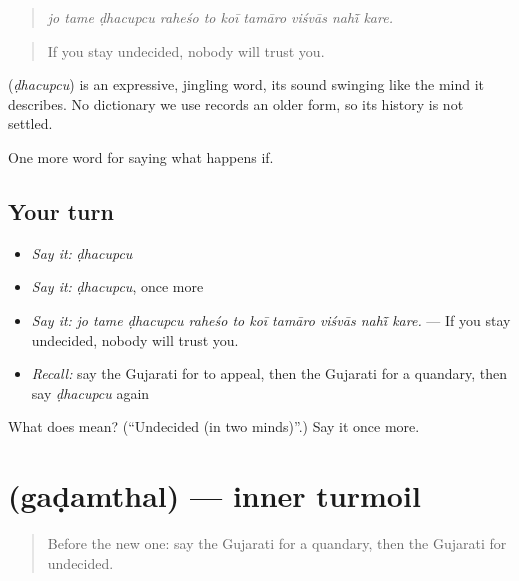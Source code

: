 \begin{quote}
\emph{jo tame ḍhacupcu raheśo to koī tamāro viśvās nahī̃ kare.}
\end{quote}

\begin{quote}
If you stay undecided, nobody will trust you.
\end{quote}

\begin{cousinweb}
\textbf{} (\emph{ḍhacupcu}) is an expressive, jingling word, its sound swinging like the mind it describes. No dictionary we use records an older form, so its history is not settled.
\end{cousinweb}

\begin{grammarlens}[title={What you've built}]
One more word for saying what happens if.
\end{grammarlens}

\subsection*{Your turn}
\begin{itemize}
\raggedright
  \item \emph{Say it:} \emph{ḍhacupcu}
  \item \emph{Say it:} \emph{ḍhacupcu}, once more
  \item \emph{Say it:} \emph{jo tame ḍhacupcu raheśo to koī tamāro viśvās nahī̃ kare.} — If you stay undecided, nobody will trust you.
  \item \emph{Recall:} say the Gujarati for to appeal, then the Gujarati for a quandary, then say \emph{ḍhacupcu} again
\end{itemize}

\begin{tcolorbox}[breakable,colback=teal!4,colframe=teal!35!black,title={Before you move on}]
What does  mean? (\textquotedblleft{}Undecided (in two minds)\textquotedblright{}.) Say it once more.
\end{tcolorbox}
\section[\texorpdfstring{\gu{ગડમથલ} (gaḍamthal)}{ગડમથલ (gaḍamthal)}]{ (gaḍamthal) — inner turmoil}

\label{lesson:GU-C538-gadamthal}



\begin{quote}
Before the new one: say the Gujarati for a quandary, then the Gujarati for undecided.
\end{quote}

